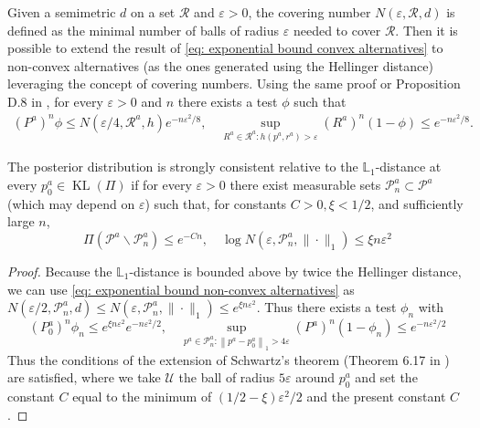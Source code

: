Given a semimetric $d$ on a set $\mathcal{R}$ and $\varepsilon>0$, the covering number $N(\varepsilon, \mathcal{R}, d)$ is defined as the minimal number of balls of radius $\varepsilon$ needed to cover $\mathcal{R}$. Then it is possible to extend the result of \eqref{eq: exponential bound convex alternatives} to non-convex alternatives (as the ones generated using the Hellinger distance) leveraging the concept of covering numbers. Using the same proof or Proposition D.8 in \cite{4}, for every $\varepsilon>0$ and $n$ there exists a test $\phi$ such that
\begin{align}\label{eq: exponential bound non-convex alternatives}
(P^a)^n \phi \leq N(\varepsilon / 4, \mathcal{R}^a, h) e^{-n \varepsilon^2 / 8}, \quad \sup _{R^a \in \mathcal{R}^a: h(p^a, r^a)>\varepsilon} (R^a)^n(1-\phi) \leq e^{-n \varepsilon^2 / 8}.
\end{align}


\begin{theorem}\label{thm: consistency in L_1}
    The posterior distribution is strongly consistent relative to the $\mathbb{L}_1$-distance at every $p^a_0 \in \operatorname{KL}(\Pi)$ if for every $\varepsilon>0$ there exist measurable sets $\mathcal{P}^a_n \subset \mathcal{P}^a$ (which may depend on $\varepsilon$) such that, for constants $C>0, \xi<1 / 2$, and sufficiently large $n$,
    $$
    \Pi\left(\mathcal{P}^a \backslash \mathcal{P}^a_n\right) \leq e^{-C n}, \quad \log N\left(\varepsilon, \mathcal{P}^a_n,\|\cdot\|_1\right) \leq \xi n \varepsilon^2
    $$
\end{theorem}
\begin{proof}
    Because the $\mathbb{L}_1$-distance is bounded above by twice the Hellinger distance, we can use \eqref{eq: exponential bound non-convex alternatives} as $N\left(\varepsilon / 2, \mathcal{P}^a_n, d\right) \leq N\left(\varepsilon, \mathcal{P}^a_n,\|\cdot\|_1\right) \leq e^{\xi n \varepsilon^2}$. Thus there exists a test $\phi_n$ with
    $$
    (P^a_0)^n \phi_n \leq e^{\xi n \varepsilon^2} e^{-n \varepsilon^2 / 2}, \quad \sup _{p^a \in \mathcal{P}^a_n:\left\|p^a-p^a_0\right\|_1>4 \varepsilon} (P^a)^n\left(1-\phi_n\right) \leq e^{-n \varepsilon^2 / 2}
    $$
    Thus the conditions of the extension of Schwartz's theorem (Theorem 6.17 in \cite{4}) are satisfied, where we take $\mathcal{U}$ the ball of radius $5 \varepsilon$ around $p^a_0$ and set the constant $C$ equal to the minimum of $(1 / 2-\xi) \varepsilon^2 / 2$ and the present constant $C$.
\end{proof}


%
%